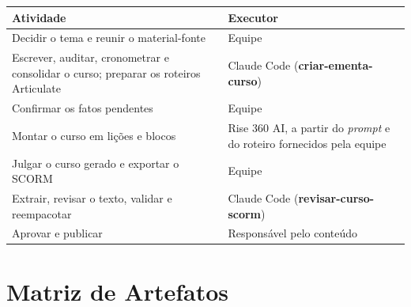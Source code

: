 \documentclass[12pt,a4paper]{article}
\newcommand{\skill}[1]{\textsf{\textbf{#1}}}
\begin{document}
\begingroup\small
\renewcommand{\arraystretch}{1.3}
\begin{longtable}{@{}L{0.55\textwidth}L{0.39\textwidth}@{}}
\toprule
\textbf{Atividade} & \textbf{Executor} \\
\midrule
\endhead
Decidir o tema e reunir o material-fonte & Equipe \\
Escrever, auditar, cronometrar e consolidar o curso; preparar os roteiros Articulate & Claude Code (\skill{criar-ementa-curso}) \\
Confirmar os fatos pendentes & Equipe \\
Montar o curso em lições e blocos & Rise 360 AI, a partir do \textit{prompt} e do roteiro fornecidos pela equipe \\
Julgar o curso gerado e exportar o SCORM & Equipe \\
Extrair, revisar o texto, validar e reempacotar & Claude Code (\skill{revisar-curso-scorm}) \\
Aprovar e publicar & Responsável pelo conteúdo \\
\bottomrule
\end{longtable}
\endgroup

\section{Matriz de Artefatos}\label{sec:artefatos}
\end{document}
